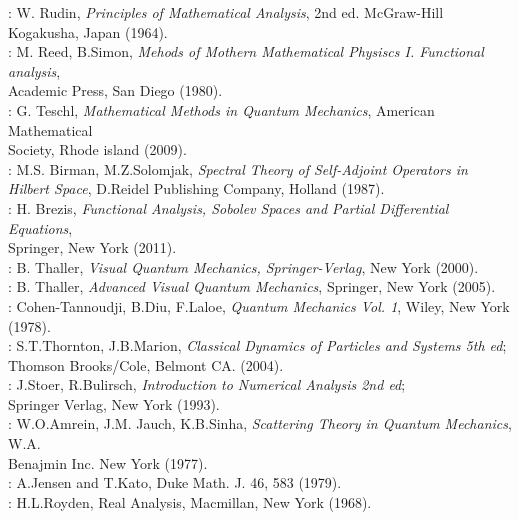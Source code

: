 \documentclass[12pt]{book}
\numberwithin{equation}{chapter}
\def\n{\noindent}
\begin{document}
\n [7]: W. Rudin, \emph{Principles of Mathematical Analysis}, 2nd ed. McGraw-Hill Kogakusha, Japan (1964).\\

\n [8]: M. Reed, B.Simon, \emph{Mehods of Mothern Mathematical Physiscs I. Functional analysis},\\ 
Academic Press, San Diego (1980).\\

\n [9]: G. Teschl, \emph{Mathematical Methods in Quantum Mechanics}, American Mathematical\\ Society, Rhode island (2009).\\

\n [10]: M.S. Birman, M.Z.Solomjak, \emph{Spectral Theory of Self-Adjoint Operators in Hilbert Space}, D.Reidel Publishing Company, Holland (1987).\\

\n [11]: H. Brezis, \emph{Functional Analysis, Sobolev Spaces and Partial Differential Equations},\\ Springer, New York (2011).\\

\n [12]: B. Thaller, \emph{Visual Quantum Mechanics, Springer-Verlag}, New York (2000).\\

\n [13]: B. Thaller, \emph{Advanced Visual Quantum Mechanics}, Springer, New York (2005).\\

\n [14]: Cohen-Tannoudji, B.Diu, F.Laloe, \emph{Quantum Mechanics Vol. 1}, Wiley, New York (1978).\\

\n [15]: S.T.Thornton, J.B.Marion, \emph{Classical Dynamics of Particles and Systems 5th ed};\\ Thomson Brooks/Cole, Belmont CA. (2004).\\

\n [16]: J.Stoer, R.Bulirsch, \emph{Introduction to Numerical Analysis 2nd ed};\\ 
Springer Verlag, New York (1993).\\

\n [17]: W.O.Amrein, J.M. Jauch, K.B.Sinha, \emph{Scattering Theory in Quantum Mechanics}, W.A.\\ Benajmin Inc. New York (1977).\\

\n [18]: A.Jensen and T.Kato, Duke Math. J. 46, 583 (1979).\\

\n [19]: H.L.Royden, Real Analysis, Macmillan, New York (1968).\\
\end{document}
